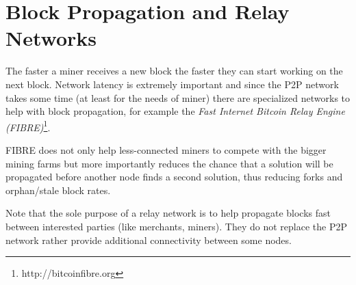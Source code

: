 \section{Block Propagation and Relay Networks}
The faster a miner receives a new block the faster they can start working on the next block. Network latency is extremely important and since the P2P network takes some time (at least for the needs of miner) there are specialized networks to help with block propagation, for example the \emph{Fast Internet Bitcoin Relay Engine (FIBRE)}\footnote{http://bitcoinfibre.org}. 

FIBRE does not only help less-connected miners to compete with the bigger mining farms but more importantly reduces the chance that a solution will be propagated before another node finds a second solution, thus reducing forks and orphan/stale block rates.

Note that the sole purpose of a relay network is to help propagate blocks fast between interested parties (like merchants, miners). They do not replace the P2P network rather provide additional connectivity between some nodes.


